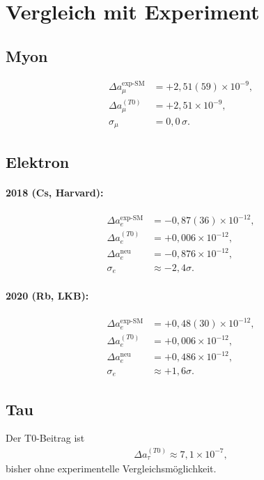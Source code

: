 \documentclass[12pt,a4paper]{article}
\theoremstyle{definition}
\begin{document}
	\section{Vergleich mit Experiment}
	
	\subsection*{Myon}
	\begin{align}
		\Delta a_\mu^{\text{exp-SM}} &= +2,51(59) \times 10^{-9}, \\
		\Delta a_\mu^{(T0)} &= +2,51 \times 10^{-9}, \\
		\sigma_\mu &= 0,0 \,\sigma.
	\end{align}
	
	\subsection*{Elektron}
	\paragraph{2018 (Cs, Harvard):}
	\begin{align}
		\Delta a_e^{\text{exp-SM}} &= -0,87(36) \times 10^{-12}, \\
		\Delta a_e^{(T0)} &= +0,006 \times 10^{-12}, \\
		\Delta a_e^{\text{neu}} &= -0,876 \times 10^{-12}, \\
		\sigma_e &\approx -2,4\sigma.
	\end{align}
	
	\paragraph{2020 (Rb, LKB):}
	\begin{align}
		\Delta a_e^{\text{exp-SM}} &= +0,48(30) \times 10^{-12}, \\
		\Delta a_e^{(T0)} &= +0,006 \times 10^{-12}, \\
		\Delta a_e^{\text{neu}} &= +0,486 \times 10^{-12}, \\
		\sigma_e &\approx +1,6\sigma.
	\end{align}
	
	\subsection*{Tau}
	Der T0-Beitrag ist
	\begin{align}
		\Delta a_\tau^{(T0)} \approx 7,1 \times 10^{-7},
	\end{align}
	bisher ohne experimentelle Vergleichsmöglichkeit.
	
\end{document}
